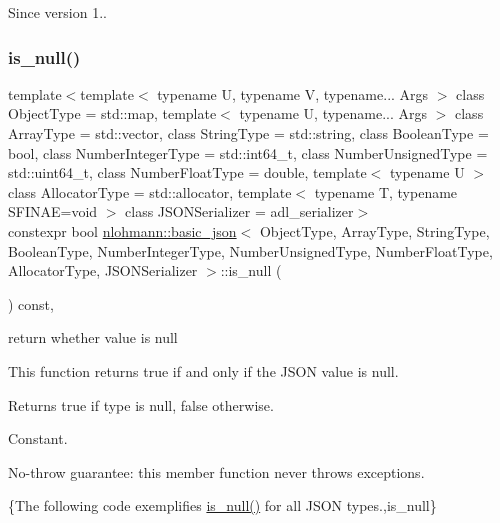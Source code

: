 \begin{DoxySince}{Since}
version 1.. 
\end{DoxySince}
\mbox{\label{classnlohmann_1_1basic__json_a8faa039ca82427ed29c486ffd00600c3}} 
\subsubsection{\texorpdfstring{is\+\_\+null()}{is\_null()}}
{\footnotesize\ttfamily template$<$template$<$ typename U, typename V, typename... Args $>$ class Object\+Type = std\+::map, template$<$ typename U, typename... Args $>$ class Array\+Type = std\+::vector, class String\+Type  = std\+::string, class Boolean\+Type  = bool, class Number\+Integer\+Type  = std\+::int64\+\_\+t, class Number\+Unsigned\+Type  = std\+::uint64\+\_\+t, class Number\+Float\+Type  = double, template$<$ typename U $>$ class Allocator\+Type = std\+::allocator, template$<$ typename T, typename S\+F\+I\+N\+A\+E=void $>$ class J\+S\+O\+N\+Serializer = adl\+\_\+serializer$>$ \\
constexpr bool \mbox{\hyperlink{classnlohmann_1_1basic__json}{nlohmann\+::basic\+\_\+json}}$<$ Object\+Type, Array\+Type, String\+Type, Boolean\+Type, Number\+Integer\+Type, Number\+Unsigned\+Type, Number\+Float\+Type, Allocator\+Type, J\+S\+O\+N\+Serializer $>$\+::is\+\_\+null (\begin{DoxyParamCaption}{ }\end{DoxyParamCaption}) const\hspace{0.3cm}{\ttfamily [inline]}, {\ttfamily [noexcept]}}



return whether value is null 

This function returns true if and only if the J\+S\+ON value is null.

\begin{DoxyReturn}{Returns}
{\ttfamily true} if type is null, {\ttfamily false} otherwise.
\end{DoxyReturn}
Constant.

No-\/throw guarantee\+: this member function never throws exceptions.

\{The following code exemplifies {\ttfamily \mbox{\hyperlink{classnlohmann_1_1basic__json_a8faa039ca82427ed29c486ffd00600c3}{is\+\_\+null()}}} for all J\+S\+ON types.,is\+\_\+null\}

